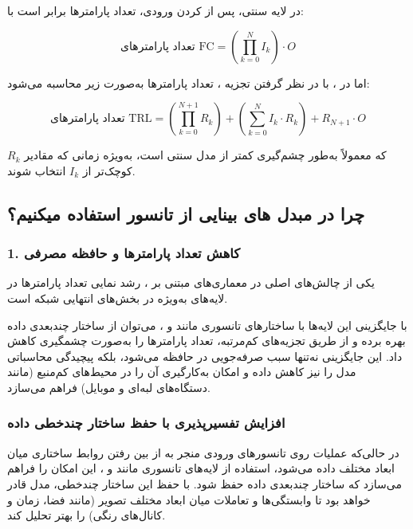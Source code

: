 در لایه  سنتی، پس از  کردن ورودی، تعداد پارامترها برابر است با:

\[
\text{تعداد پارامترهای FC} = \left( \prod_{k=0}^{N} I_k \right) \cdot O
\]

اما در ، با در نظر گرفتن تجزیه ، تعداد پارامترها به‌صورت زیر محاسبه می‌شود:

\[
\text{تعداد پارامترهای TRL} = \left( \prod_{k=0}^{N+1} R_k \right) + \left( \sum_{k=0}^{N} I_k \cdot R_k \right) + R_{N+1} \cdot O
\]

که معمولاً به‌طور چشم‌گیری کمتر از مدل سنتی است، به‌ویژه زمانی که مقادیر $R_k$ کوچک‌تر از $I_k$ انتخاب شوند.

\subsection{چرا در مبدل های بینایی از تانسور استفاده میکنیم؟}




\subsubsection*{1. \textbf{کاهش تعداد پارامترها و حافظه مصرفی}}

یکی از چالش‌های اصلی در معماری‌های مبتنی بر ، رشد نمایی تعداد پارامترها در لایه‌های  به‌ویژه در بخش‌های انتهایی شبکه است.

با جایگزینی این لایه‌ها با ساختارهای تانسوری مانند  و ، می‌توان از ساختار چندبعدی داده بهره برده و از طریق تجزیه‌های کم‌مرتبه، تعداد پارامترها را به‌صورت چشمگیری کاهش داد. این جایگزینی نه‌تنها سبب صرفه‌جویی در حافظه می‌شود، بلکه پیچیدگی محاسباتی مدل را نیز کاهش داده و امکان به‌کارگیری آن را در محیط‌های کم‌منبع (مانند دستگاه‌های لبه‌ای و موبایل) فراهم می‌سازد.


\subsubsection*{\textbf{افزایش تفسیرپذیری با حفظ ساختار چندخطی داده}}

در حالی‌که عملیات  روی تانسورهای ورودی منجر به از بین رفتن روابط ساختاری میان ابعاد مختلف داده می‌شود، استفاده از لایه‌های تانسوری مانند  و ، این امکان را فراهم می‌سازد که ساختار چندبعدی داده حفظ شود. با حفظ این ساختار چندخطی، مدل قادر خواهد بود تا وابستگی‌ها و تعاملات میان ابعاد مختلف تصویر (مانند فضا، زمان و کانال‌های رنگی) را بهتر تحلیل کند.

